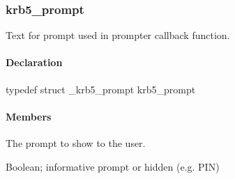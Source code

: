 \documentclass[letterpaper,10pt,english]{sphinxmanual}
\begin{document}

\begin{fulllineitems}
\label{appdev/refs/types/krb5_const_principal:c.krb5_const_principal.type}
\end{fulllineitems}



\subsubsection{krb5\_prompt}
\label{appdev/refs/types/krb5_prompt:krb5-prompt}\label{appdev/refs/types/krb5_prompt::doc}\label{appdev/refs/types/krb5_prompt:krb5-prompt-struct}

\begin{fulllineitems}
\label{appdev/refs/types/krb5_prompt:c.krb5_prompt}
\end{fulllineitems}


Text for prompt used in prompter callback function.


\paragraph{Declaration}
\label{appdev/refs/types/krb5_prompt:declaration}
typedef struct \_krb5\_prompt  krb5\_prompt


\paragraph{Members}
\label{appdev/refs/types/krb5_prompt:members}

\begin{fulllineitems}
\label{appdev/refs/types/krb5_prompt:c.krb5_prompt.prompt}
The prompt to show to the user.

\end{fulllineitems}


\begin{fulllineitems}
\label{appdev/refs/types/krb5_prompt:c.krb5_prompt.hidden}
Boolean; informative prompt or hidden (e.g.
PIN)

\end{fulllineitems}
\end{document}

